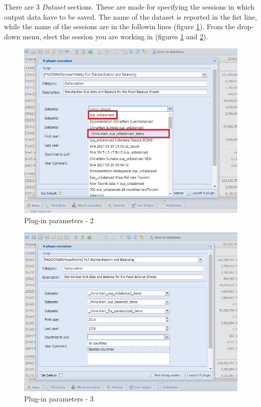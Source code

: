 \documentclass[]{article}
\begin{document}
There are 3 \emph{Dataset} sections. These are made for specifying the
sessions in which output data have to be saved. The name of the dataset
is reported in the fist line, while the name of the sessions are in the
followin lines (figure \ref{fig:f28}). From the drop-down menu, elect
the session you are working in (figures \ref{fig:f28} and
\ref{fig:f29}).

\begin{figure}[H]

{\centering \includegraphics[width=1\linewidth]{images/standPlugin/27_parametersPI2} 

}

\caption{\label{fig:f28}Plug-in parameters - 2}\label{fig:f28}
\end{figure}

\begin{figure}[H]

{\centering \includegraphics[width=1\linewidth]{images/standPlugin/28_parametersPI3} 

}

\caption{\label{fig:f29}Plug-in parameters - 3}\label{fig:f29}
\end{figure}
\end{document}

